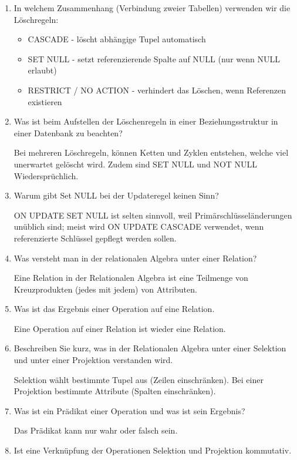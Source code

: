 \documentclass[a4paper]{article}
\begin{document}
\begin{enumerate}
    Integrität soll durch Löschregeln bewahrt bleiben.
    \item In welchem Zusammenhang (Verbindung zweier Tabellen) verwenden wir die Löschregeln:
    
    \begin{itemize}
        \item CASCADE - löscht abhängige Tupel automatisch
        \item SET NULL - setzt referenzierende Spalte auf NULL (nur wenn NULL erlaubt)
        \item RESTRICT / NO ACTION - verhindert das Löschen, wenn Referenzen existieren
    \end{itemize}
    \item Was ist beim Aufstellen der Löschenregeln in einer Beziehungsstruktur in einer Datenbank zu beachten?

    Bei mehreren Löschregeln, können Ketten und Zyklen entstehen, welche viel unerwartet gelöscht wird. Zudem sind SET NULL und NOT NULL Wiedersprüchlich.
    \item Warum gibt Set NULL bei der Updateregel keinen Sinn?
    
    ON UPDATE SET NULL ist selten sinnvoll, weil Primärschlüsseländerungen unüblich sind; meist wird ON UPDATE CASCADE verwendet, wenn referenzierte Schlüssel gepflegt werden sollen.
    \item Was versteht man in der relationalen Algebra unter einer Relation?
    
    Eine Relation in der Relationalen Algebra ist eine Teilmenge von Kreuzprodukten (jedes mit jedem) von Attributen.
    \item Was ist das Ergebnis einer Operation auf eine Relation.
    
    Eine Operation auf einer Relation ist wieder eine Relation.
    \item Beschreiben Sie kurz, was in der Relationalen Algebra unter einer Selektion und unter einer Projektion verstanden wird.
    
    Selektion wählt bestimmte Tupel aus (Zeilen einschränken). Bei einer Projektion bestimmte Attribute (Spalten einschränken).
    \item Was ist ein Prädikat einer Operation und was ist sein Ergebnis?
    
    Das Prädikat kann nur wahr oder falsch sein.
    \item Ist eine Verknüpfung der Operationen Selektion und Projektion kommutativ.
    

\end{enumerate}
\end{document}
